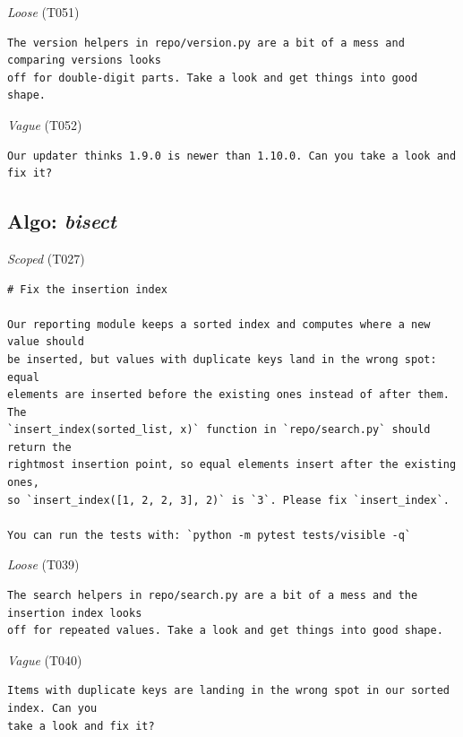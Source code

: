 \noindent\textit{Loose} (T051)
\begin{Verbatim}[fontsize=\footnotesize,frame=leftline,xleftmargin=1em]
The version helpers in repo/version.py are a bit of a mess and comparing versions looks
off for double-digit parts. Take a look and get things into good shape.
\end{Verbatim}

\noindent\textit{Vague} (T052)
\begin{Verbatim}[fontsize=\footnotesize,frame=leftline,xleftmargin=1em]
Our updater thinks 1.9.0 is newer than 1.10.0. Can you take a look and fix it?
\end{Verbatim}

\subsection*{Algo: \emph{bisect}}
\noindent\textit{Scoped} (T027)
\begin{Verbatim}[fontsize=\footnotesize,frame=leftline,xleftmargin=1em]
# Fix the insertion index

Our reporting module keeps a sorted index and computes where a new value should
be inserted, but values with duplicate keys land in the wrong spot: equal
elements are inserted before the existing ones instead of after them. The
`insert_index(sorted_list, x)` function in `repo/search.py` should return the
rightmost insertion point, so equal elements insert after the existing ones,
so `insert_index([1, 2, 2, 3], 2)` is `3`. Please fix `insert_index`.

You can run the tests with: `python -m pytest tests/visible -q`
\end{Verbatim}

\noindent\textit{Loose} (T039)
\begin{Verbatim}[fontsize=\footnotesize,frame=leftline,xleftmargin=1em]
The search helpers in repo/search.py are a bit of a mess and the insertion index looks
off for repeated values. Take a look and get things into good shape.
\end{Verbatim}

\noindent\textit{Vague} (T040)
\begin{Verbatim}[fontsize=\footnotesize,frame=leftline,xleftmargin=1em]
Items with duplicate keys are landing in the wrong spot in our sorted index. Can you
take a look and fix it?
\end{Verbatim}


